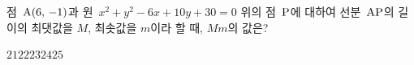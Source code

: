 점~$\mathrm{A}(6,\mkern3mu -1)$과 원~$x^2+y^2-6x+10y+30=0$ 위의 점~$\mathrm{P}$에 대하여 선분~$\mathrm{AP}$의 길이의 최댓값을 $M$, 최솟값을 $m$이라 할 때, $Mm$의 값은?
\begin{choices32}{$21$}{$22$}{$23$}{$24$}{$25$}\end{choices32}
